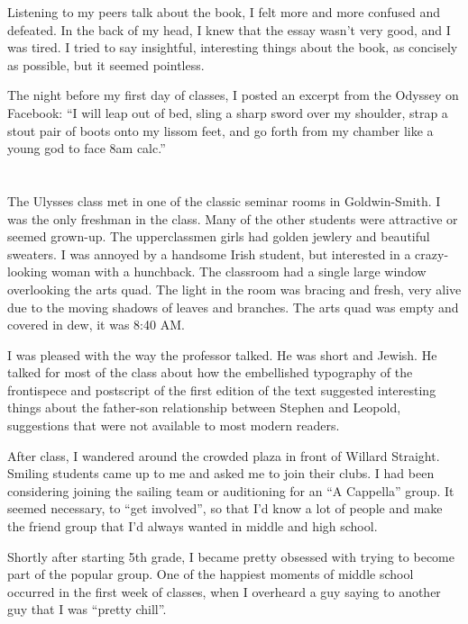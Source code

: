 Listening to my peers talk about the book, I felt more and more confused and
defeated.  In the back of my head, I knew that the essay wasn't very good, and I
was tired.  I tried to say insightful, interesting things about the book, as
concisely as possible, but it seemed pointless.

The night before my first day of classes, I posted an excerpt from the Odyssey
on Facebook: ``I will leap out of bed, sling a sharp sword over my shoulder,
strap a stout pair of boots onto my lissom feet, and go forth from my chamber
like a young god to face 8am calc.''

\section{}

The Ulysses class met in one of the classic seminar rooms in Goldwin-Smith.  I
was the only freshman in the class.  Many of the other students were attractive
or seemed grown-up.  The upperclassmen girls had golden jewlery and beautiful
sweaters.  I was annoyed by a handsome Irish student, but interested in a
crazy-looking woman with a hunchback.  The classroom had a single large window
overlooking the arts quad.  The light in the room was bracing and fresh, very
alive due to the moving shadows of leaves and branches.  The arts quad was empty
and covered in dew, it was 8:40 AM.

I was pleased with the way the professor talked.  He was short and Jewish.  He
talked for most of the class about how the embellished typography of the
frontispece and postscript of the first edition of the text suggested
interesting things about the father-son relationship between Stephen and
Leopold, suggestions that were not available to most modern readers.

After class, I wandered around the crowded plaza in front of Willard Straight.
Smiling students came up to me and asked me to join their clubs.  I had been
considering joining the sailing team or auditioning for an ``A Cappella'' group.
It seemed necessary, to ``get involved'', so that I'd know a lot of people and
make the friend group that I'd always wanted in middle and high school.  

Shortly after starting 5th grade, I became pretty obsessed with trying to become
part of the popular group.  One of the happiest moments of middle school
occurred in the first week of classes, when I overheard a guy saying to another
guy that I was ``pretty chill''. 

